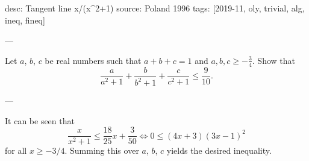 desc: Tangent line x/(x^2+1)
source: Poland 1996
tags: [2019-11, oly, trivial, alg, ineq, fineq]

---

Let $a$, $b$, $c$ be real numbers such that $a+b+c=1$ and $a,b,c\ge-\frac34$. Show that \[\frac a{a^2+1}+\frac b{b^2+1}+\frac c{c^2+1}\le\frac9{10}.\]

---

It can be seen that \[\frac x{x^2+1}\le\frac{18}{25}x+\frac3{50}\iff0\le(4x+3)(3x-1)^2\]
for all $x\ge-3/4$. Summing this over $a$, $b$, $c$ yields the desired inequality.
